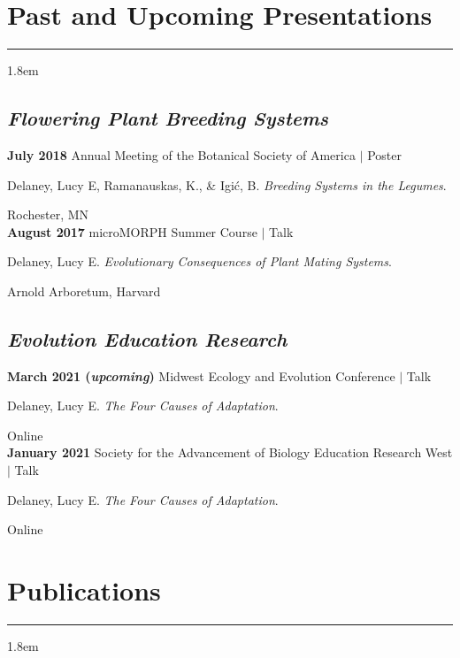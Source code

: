 \documentclass[]{article}
\begin{document}
\section{Past and Upcoming Presentations}
\hrule
\vspace{4mm}
\leftskip 1.8em
\subsection{\textit{Flowering Plant Breeding Systems}}
\vspace{2mm}

\textbf{July 2018} Annual Meeting of the Botanical Society of America $\vert$ Poster

Delaney, Lucy E, Ramanauskas, K., \& Igić, B. \textit{Breeding Systems in the Legumes}. \href{https://ledelaney.org/static/posters/poster.png}{\faFileImage}

Rochester, MN\\

\textbf{August 2017} microMORPH Summer Course $\vert$ Talk

Delaney, Lucy E. \textit{Evolutionary Consequences of Plant Mating Systems}. \href{https://www.dropbox.com/s/o7hcg5riw97wf9i/08-2017-microMORPH.pdf?dl=1}{\faImages}

Arnold Arboretum, Harvard

\subsection{\textit{Evolution Education Research}}
\vspace{2mm}

\textbf{March 2021 (\textit{upcoming})} Midwest Ecology and Evolution Conference $\vert$ Talk

Delaney, Lucy E. \textit{The Four Causes of Adaptation}.

Online\\

\textbf{January 2021} Society for the Advancement of Biology Education Research West $\vert$ Talk

Delaney, Lucy E. \textit{The Four Causes of Adaptation}. \href{https://ledelaney.org/talks/sabertalk/SABER-slides.html}{\faImages} \href{https://github.com/ledelaney/01-21-SABERwest}{\faGithub}

Online

\section{Publications}
\hrule
\vspace{4mm}
\leftskip 1.8em
\end{document}
